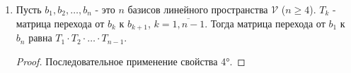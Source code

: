 \begin{enumerate}[label={\arabic*°.}]
\begin{proof}
        Согласно определению $\eqref{fig:definition_17_1}$ матрицы перехода, имеем равенства
        $$c = bT_{b \to c}, \quad d = cU_{c \to d},$$
        откуда
        $$d = cU_{c \to d} = (b T_{b \to c}) \cdot U_{c \to d} = b(T_{b \to c} \cdot U_{c \to d}),$$
        т.е. $T_{b \to c} \cdot U_{c \to d} = K_{b \to d}$ - матрица перехода от базиса $b$ к базису $d$.
    \end{proof}

    \item Пусть $b_1, b_2, \ldots, b_n$ - это $n$ базисов линейного пространства $\mathcal{V}$ ($n \geq 4$). $T_k$ - матрица перехода от $b_k$ к $b_{k + 1}$, $k = \overline{1, n - 1}$. Тогда матрица перехода от $b_1$ к $b_n$ равна $T_1\cdot T_2 \cdot \ldots \cdot T_{n - 1}$.
    \begin{proof}
        Последовательное применение свойства 4°.
    \end{proof}
\end{enumerate}

